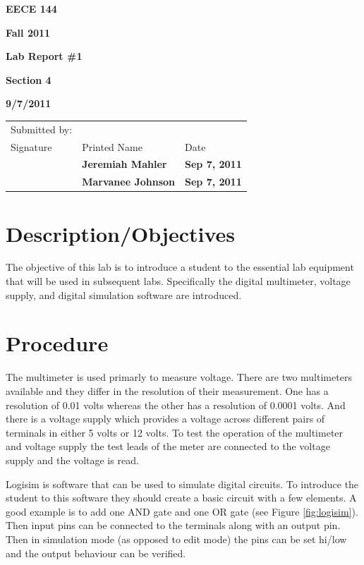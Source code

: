 \documentclass[12pt]{article}
\begin{document}

\centerline{\bf EECE 144}
\centerline{\bf Fall 2011}
\centerline{\bf}
\centerline{\bf Lab Report \#1}
\centerline{\bf Section 4}
\centerline{\bf 9/7/2011}

\begin{center}
\begin{tabularx}{\textwidth}[b]{X X l}
Submitted by: & & \\
Signature & Printed Name & Date \\
\hline
\multicolumn{1}{|X|}{} & \multicolumn{1}{|l|}{\bigstrut \bf Jeremiah Mahler} & \multicolumn{1}{|l|}{\bf Sep 7, 2011} \\
\hline
\multicolumn{1}{|X|}{} & \multicolumn{1}{|l|}{\bigstrut \bf Marvanee Johnson} & \multicolumn{1}{|l|}{\bf Sep 7, 2011} \\
\hline
\end{tabularx}
\end{center}

\section{Description/Objectives}

The objective of this lab is to introduce a student to
the essential lab equipment that will be used in subsequent labs.
Specifically the digital multimeter, voltage supply, and digital simulation
software are introduced.

\section{Procedure}

The multimeter is used primarly to measure voltage.
There are two multimeters available and they differ in
the resolution of their measurement.
One has a resolution of 0.01 volts whereas the other has a resolution
of 0.0001 volts.
And there is a voltage supply which provides a voltage across
different pairs of terminals in either 5 volts or 12 volts.
To test the operation of the multimeter and voltage supply the test
leads of the meter are connected to the voltage supply and the voltage
is read.

Logisim \cite{LOGISIM} is software that can be used to simulate digital
circuits.
To introduce the student to this software they should create a basic circuit
with a few elements.
A good example is to add one AND gate and one OR gate (see Figure \ref{fig:logisim}).
Then input pins can be connected to the terminals along with an output pin.
Then in simulation mode (as opposed to edit mode) the pins can be set hi/low
and the output behaviour can be verified.
\end{document}
